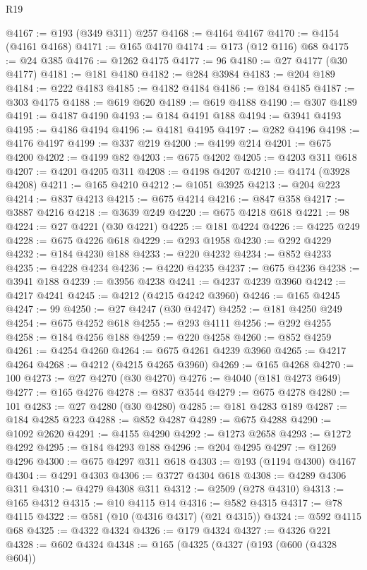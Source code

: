 \begin{lexlean}{R19}
\begin{coremodule}
@4167 := @193 (@349 @311) @257
@4168 := @4164 @4167
@4170 := @4154 (@4161 @4168)
@4171 := @165 @4170
@4174 := @173 (@12 @116) @68
@4175 := @24 @385
@4176 := @1262 @4175
@4177 := 96
@4180 := @27 @4177 (@30 @4177)
@4181 := @181 @4180
@4182 := @284 @3984
@4183 := @204 @189
@4184 := @222 @4183
@4185 := @4182 @4184
@4186 := @184 @4185
@4187 := @303 @4175
@4188 := @619 @620
@4189 := @619 @4188
@4190 := @307 @4189
@4191 := @4187 @4190
@4193 := @184 @4191 @188
@4194 := @3941 @4193
@4195 := @4186 @4194
@4196 := @4181 @4195
@4197 := @282 @4196
@4198 := @4176 @4197
@4199 := @337 @219
@4200 := @4199 @214
@4201 := @675 @4200
@4202 := @4199 @82
@4203 := @675 @4202
@4205 := @4203 @311 @618
@4207 := @4201 @4205 @311
@4208 := @4198 @4207
@4210 := @4174 (@3928 @4208)
@4211 := @165 @4210
@4212 := @1051 @3925
@4213 := @204 @223
@4214 := @837 @4213
@4215 := @675 @4214
@4216 := @847 @358
@4217 := @3887 @4216
@4218 := @3639 @249
@4220 := @675 @4218 @618
@4221 := 98
@4224 := @27 @4221 (@30 @4221)
@4225 := @181 @4224
@4226 := @4225 @249
@4228 := @675 @4226 @618
@4229 := @293 @1958
@4230 := @292 @4229
@4232 := @184 @4230 @188
@4233 := @220 @4232
@4234 := @852 @4233
@4235 := @4228 @4234
@4236 := @4220 @4235
@4237 := @675 @4236
@4238 := @3941 @188
@4239 := @3956 @4238
@4241 := @4237 @4239 @3960
@4242 := @4217 @4241
@4245 := @4212 (@4215 @4242 @3960)
@4246 := @165 @4245
@4247 := 99
@4250 := @27 @4247 (@30 @4247)
@4252 := @181 @4250 @249
@4254 := @675 @4252 @618
@4255 := @293 @4111
@4256 := @292 @4255
@4258 := @184 @4256 @188
@4259 := @220 @4258
@4260 := @852 @4259
@4261 := @4254 @4260
@4264 := @675 @4261 @4239 @3960
@4265 := @4217 @4264
@4268 := @4212 (@4215 @4265 @3960)
@4269 := @165 @4268
@4270 := 100
@4273 := @27 @4270 (@30 @4270)
@4276 := @4040 (@181 @4273 @649)
@4277 := @165 @4276
@4278 := @837 @3544
@4279 := @675 @4278
@4280 := 101
@4283 := @27 @4280 (@30 @4280)
@4285 := @181 @4283 @189
@4287 := @184 @4285 @223
@4288 := @852 @4287
@4289 := @675 @4288
@4290 := @1092 @2620
@4291 := @4155 @4290
@4292 := @1273 @2658
@4293 := @1272 @4292
@4295 := @184 @4293 @188
@4296 := @204 @4295
@4297 := @1269 @4296
@4300 := @675 @4297 @311 @618
@4303 := @193 (@1194 @4300) @4167
@4304 := @4291 @4303
@4306 := @3727 @4304 @618
@4308 := @4289 @4306 @311
@4310 := @4279 @4308 @311
@4312 := @2509 (@278 @4310)
@4313 := @165 @4312
@4315 := @10 @4115 @14
@4316 := @582 @4315
@4317 := @78 @4115
@4322 := @581 (@10 (@4316 @4317) (@21 @4315))
@4324 := @592 @4115 @68
@4325 := @4322 @4324
@4326 := @179 @4324
@4327 := @4326 @221
@4328 := @602 @4324
@4348 := @165
    (@4325
      (@4327
        (@193
          (@600 (@4328 @604))

\end{coremodule}
\end{lexlean}

